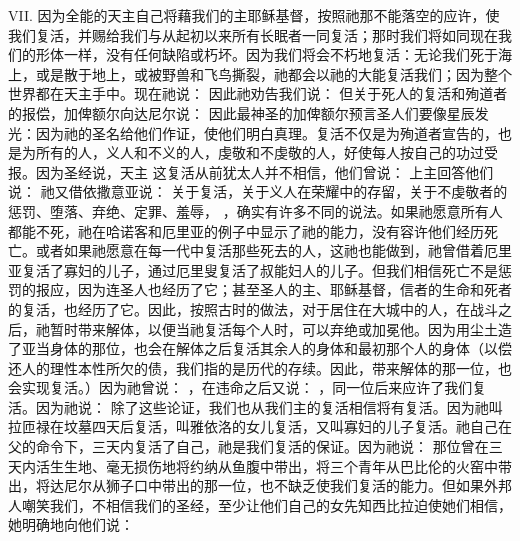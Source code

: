 VII. 因为全能的天主自己将藉我们的主耶稣基督，按照祂那不能落空的应许，使我们复活，并赐给我们与从起初以来所有长眠者一同复活；那时我们将如同现在我们的形体一样，没有任何缺陷或朽坏。因为我们将会不朽地复活：无论我们死于海上，或是散于地上，或被野兽和飞鸟撕裂，祂都会以祂的大能复活我们；因为整个世界都在天主手中。现在祂说：  因此祂劝告我们说：  但关于死人的复活和殉道者的报偿，加俾额尔向达尼尔说：  因此最神圣的加俾额尔预言圣人们要像星辰发光：因为祂的圣名给他们作证，使他们明白真理。复活不仅是为殉道者宣告的，也是为所有的人，义人和不义的人，虔敬和不虔敬的人，好使每人按自己的功过受报。因为圣经说，天主  这复活从前犹太人并不相信，他们曾说： 上主回答他们说： 祂又借依撒意亚说：  关于复活，关于义人在荣耀中的存留，关于不虔敬者的惩罚、堕落、弃绝、定罪、羞辱， ，确实有许多不同的说法。如果祂愿意所有人都能不死，祂在哈诺客和厄里亚的例子中显示了祂的能力，没有容许他们经历死亡。或者如果祂愿意在每一代中复活那些死去的人，这祂也能做到，祂曾借着厄里亚复活了寡妇的儿子，通过厄里叟复活了叔能妇人的儿子。但我们相信死亡不是惩罚的报应，因为连圣人也经历了它；甚至圣人的主、耶稣基督，信者的生命和死者的复活，也经历了它。因此，按照古时的做法，对于居住在大城中的人，在战斗之后，祂暂时带来解体，以便当祂复活每个人时，可以弃绝或加冕他。因为用尘土造了亚当身体的那位，也会在解体之后复活其余人的身体和最初那个人的身体（以偿还人的理性本性所欠的债，我们指的是历代的存续。因此，带来解体的那一位，也会实现复活。）因为祂曾说： ，在违命之后又说： ，同一位后来应许了我们复活。因为祂说：  除了这些论证，我们也从我们主的复活相信将有复活。因为祂叫拉匝禄在坟墓四天后复活，叫雅依洛的女儿复活，又叫寡妇的儿子复活。祂自己在父的命令下，三天内复活了自己，祂是我们复活的保证。因为祂说：  那位曾在三天内活生生地、毫无损伤地将约纳从鱼腹中带出，将三个青年从巴比伦的火窑中带出，将达尼尔从狮子口中带出的那一位，也不缺乏使我们复活的能力。但如果外邦人嘲笑我们，不相信我们的圣经，至少让他们自己的女先知西比拉迫使她们相信，她明确地向他们说：\par

